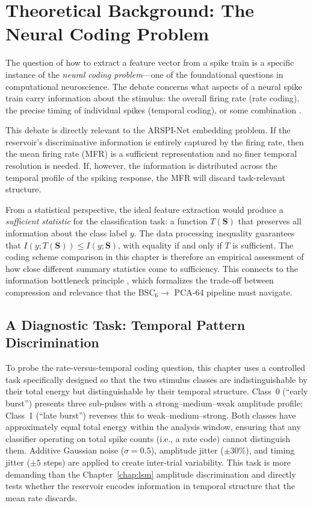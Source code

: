 \section{Theoretical Background: The Neural Coding Problem}
\label{sec:neural_coding_theory}

The question of how to extract a feature vector from a spike train is a specific instance of the \emph{neural coding problem}---one of the foundational questions in computational neuroscience. The debate concerns what aspects of a neural spike train carry information about the stimulus: the overall firing rate (rate coding), the precise timing of individual spikes (temporal coding), or some combination \cite{gerstner_spiking_2002, dayan2001, Rieke1997}.

This debate is directly relevant to the ARSPI-Net embedding problem. If the reservoir's discriminative information is entirely captured by the firing rate, then the mean firing rate (MFR) is a sufficient representation and no finer temporal resolution is needed. If, however, the information is distributed across the temporal profile of the spiking response, the MFR will discard task-relevant structure.

From a statistical perspective, the ideal feature extraction would produce a \emph{sufficient statistic} for the classification task: a function $T(\mathbf{S})$ that preserves all information about the class label $y$. The data processing inequality guarantees that $I(y; T(\mathbf{S})) \leq I(y; \mathbf{S})$, with equality if and only if $T$ is sufficient. The coding scheme comparison in this chapter is therefore an empirical assessment of how close different summary statistics come to sufficiency. This connects to the information bottleneck principle \cite{tishby_deep_2015}, which formalizes the trade-off between compression and relevance that the BSC$_6 \to$ PCA-64 pipeline must navigate.

\subsection{A Diagnostic Task: Temporal Pattern Discrimination}

To probe the rate-versus-temporal coding question, this chapter uses a controlled task specifically designed so that the two stimulus classes are indistinguishable by their total energy but distinguishable by their temporal structure. Class~0 (``early burst'') presents three sub-pulses with a strong--medium--weak amplitude profile; Class~1 (``late burst'') reverses this to weak--medium--strong. Both classes have approximately equal total energy within the analysis window, ensuring that any classifier operating on total spike counts (i.e., a rate code) cannot distinguish them. Additive Gaussian noise ($\sigma = 0.5$), amplitude jitter ($\pm 30\%$), and timing jitter ($\pm 5$ steps) are applied to create inter-trial variability. This task is more demanding than the Chapter~\ref{chap:lsm} amplitude discrimination and directly tests whether the reservoir encodes information in temporal structure that the mean rate discards.



